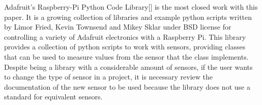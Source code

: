 \documentclass{acm_proc_article-sp}
\begin{document}
Adafruit's Raspberry-Pi Python Code Library[] is the most closed work with this paper. It is a growing collection of libraries and example python scripts written by Limor Fried, Kevin Townsend and Mikey Sklar under BSD license for controlling a variety of Adafruit electronics with a Raspberry Pi.
\newline
\newline
This library provides a collection of python scripts to work with sensors, providing classes that can be used to measure values from the sensor that the class implements. 
\newline
\newline
Despite being a library with a considerable amount of sensors, if the user wants to change the type of sensor in a project, it is necessary review the documentation of the new sensor to be used because the library does not use a standard for equivalent sensors.
\end{document}
